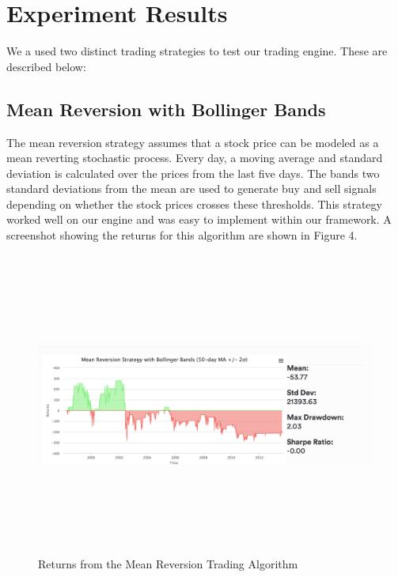 \documentclass[10pt, conference, compsocconf]{IEEEtran}
\begin{document}
\section{Experiment Results}
We a used two distinct trading strategies to test our trading engine. These are described below:
\subsection{Mean Reversion with Bollinger Bands}
The mean reversion strategy assumes that a stock price can be modeled as a mean reverting stochastic process. Every day, a moving average and standard deviation is calculated over the prices from the last five days. The bands two standard deviations from the mean are used to generate buy and sell signals depending on whether the stock prices crosses these thresholds. This strategy worked well on our engine and was easy to implement within our framework. A screenshot showing the returns for this algorithm are shown in Figure 4.
\begin{figure}
  \includegraphics[width=\textwidth,height=10cm]{Figure4}
  \caption{Returns from the Mean Reversion Trading Algorithm}
\end{figure}
\end{document}
